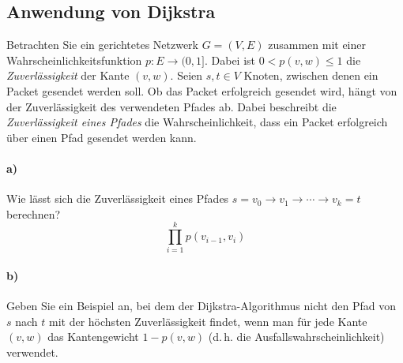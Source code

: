 \documentclass[paper=a4, fontsize=11pt]{scrartcl}
\numberwithin{equation}{section}
\numberwithin{figure}{section}
\numberwithin{table}{section}
\begin{document}
\subsection{Anwendung von Dijkstra}
Betrachten Sie ein gerichtetes Netzwerk $G=(V,E)$ zusammen mit einer
Wahrscheinlichkeitsfunktion $p:E\rightarrow (0,1]$. Dabei ist $0<p(v,w) \le 1$
die \emph{Zuverlässigkeit} der Kante $(v,w)$.
Seien $s,t\in V$ Knoten, zwischen denen ein Packet gesendet werden soll.
Ob das Packet erfolgreich gesendet wird, hängt von der Zuverlässigkeit
des verwendeten Pfades ab. Dabei beschreibt die \emph{Zuverlässigkeit eines Pfades}
die Wahrscheinlichkeit, dass ein Packet erfolgreich über einen Pfad gesendet
werden kann.

\paragraph{a)}
Wie lässt sich die Zuverlässigkeit eines Pfades $s=v_0\to v_1\to \cdots \to v_k=t$
berechnen? \\

$$\prod^{k}_{i=1} p(v_{i-1},v_{i})$$

\paragraph{b)}
Geben Sie ein Beispiel an, bei dem der Dijkstra-Algorithmus nicht den Pfad von $s$ nach $t$ mit der höchsten Zuverlässigkeit findet, wenn man für jede Kante $(v,w)$
das Kantengewicht $1-p(v,w)$ (d.\,h. die Ausfallswahrscheinlichkeit) verwendet. \\

\begin{center}
\end{center}
\end{document}
